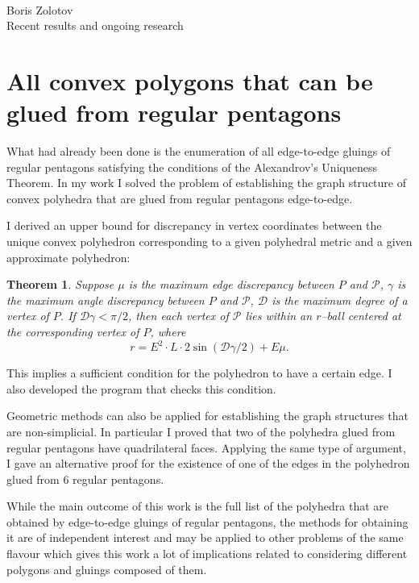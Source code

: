 \documentclass[a4paper,11pt]{article}
\newtheorem{theorem}{Theorem}
\theoremstyle{definition}
\begin{document}
\def\P{\mathcal P} \def\Ot{\tilde O}

\begin{center} \ \\ [1.5cm]
	{\Huge Boris Zolotov} \\ [0.35cm]
	{Recent results and ongoing research}
\end{center}

\section{All convex polygons that can be glued from regular pentagons}

What had already been done is the enumeration of all edge-to-edge gluings of regular pentagons satisfying the conditions of the Alexandrov's Uniqueness Theorem. In my work I solved the problem of establishing the graph structure of convex polyhedra that are glued from regular pentagons edge-to-edge.

I derived an upper bound for discrepancy in vertex coordinates between the unique convex polyhedron corresponding to a given polyhedral metric and a given approximate polyhedron:

\begin{theorem} \label{precision}
	Suppose $\mu$ is the maximum edge discrepancy between $P$ and $\P$, $\gamma$ is the maximum angle discrepancy between $P$ and $\P$, $\mathcal D$ is the maximum degree of a vertex of $P$. If $\mathcal D \gamma < \pi / 2$, then each vertex of $\P$ lies within an $r$--ball centered at the corresponding vertex of $P$, where
\begin{equation}
	r = E^2 \cdot  L \cdot 2 \sin ( \mathcal D \gamma / 2 ) + E \mu.
\end{equation} \end{theorem}

This implies a sufficient condition for the polyhedron to have a certain edge. I also developed the program that checks this condition.

Geometric methods can also be applied for establishing the graph structures that are non-simplicial. In particular I proved that two of the polyhedra glued from regular pentagons have quadrilateral faces. Applying the same type of argument, I gave an alternative proof for the existence of one of the edges in the polyhedron glued from 6 regular pentagons.

While the main outcome of this work is the full list of the polyhedra that are obtained by edge-to-edge gluings of regular pentagons, the methods for obtaining it are of independent interest and may be applied to other problems of the same flavour which gives this work a lot of implications related to considering different polygons and gluings composed of them.
\end{document}
